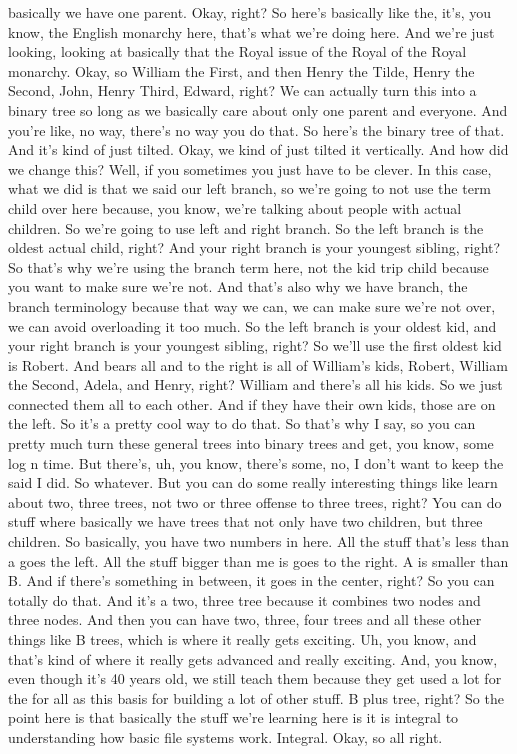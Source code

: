 basically we have one parent. Okay, right? So here's basically like the, it's, you know, the English monarchy here, that's what we're doing here. And we're just looking, looking at basically that the Royal issue of the Royal of the Royal monarchy. Okay, so William the First, and then Henry the Tilde, Henry the Second, John, Henry Third, Edward, right? We can actually turn this into a binary tree so long as we basically care about only one parent and everyone. And you're like, no way, there's no way you do that. So here's the binary tree of that. And it's kind of just tilted. Okay, we kind of just tilted it vertically. And how did we change this? Well, if you sometimes you just have to be clever. In this case, what we did is that we said our left branch, so we're going to not use the term child over here because, you know, we're talking about people with actual children. So we're going to use left and right branch. So the left branch is the oldest actual child, right? And your right branch is your youngest sibling, right? So that's why we're using the branch term here, not the kid trip child because you want to make sure we're not. And that's also why we have branch, the branch terminology because that way we can, we can make sure we're not over, we can avoid overloading it too much. So the left branch is your oldest kid, and your right branch is your youngest sibling, right? So we'll use the first oldest kid is Robert. And bears all and to the right is all of William's kids, Robert, William the Second, Adela, and Henry, right? William and there's all his kids. So we just connected them all to each other. And if they have their own kids, those are on the left. So it's a pretty cool way to do that. So that's why I say, so you can pretty much turn these general trees into binary trees and get, you know, some log n time. But there's, uh, you know, there's some, no, I don't want to keep the said I did. So whatever. But you can do some really interesting things like learn about two, three trees, not two or three offense to three trees, right? You can do stuff where basically we have trees that not only have two children, but three children. So basically, you have two numbers in here. All the stuff that's less than a goes the left. All the stuff bigger than me is goes to the right. A is smaller than B. And if there's something in between, it goes in the center, right? So you can totally do that. And it's a two, three tree because it combines two nodes and three nodes. And then you can have two, three, four trees and all these other things like B trees, which is where it really gets exciting. Uh, you know, and that's kind of where it really gets advanced and really exciting. And, you know, even though it's 40 years old, we still teach them because they get used a lot for the for all as this basis for building a lot of other stuff. B plus tree, right? So the point here is that basically the stuff we're learning here is it is integral to understanding how basic file systems work. Integral. Okay, so all right.

